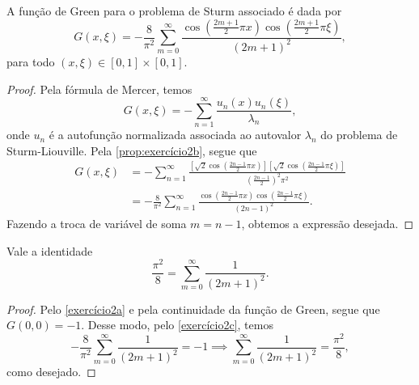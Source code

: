 \begin{corollary}\label{exercício2c}
    A função de Green para o problema de Sturm associado é dada por
    \begin{equation*}
        G(x, \xi) = - \frac{8}{\pi^2}\sum_{m = 0}^{\infty} \frac{\cos\left(\frac{2m + 1}{2}\pi x\right)\cos\left(\frac{2m + 1}{2}\pi \xi\right)}{(2m + 1)^2},
    \end{equation*}
    para todo \((x, \xi) \in [0,1]\times[0,1]\).
\end{corollary}
\begin{proof}
    Pela fórmula de Mercer, temos
    \begin{equation*}
        G(x,\xi) = - \sum_{n = 1}^{\infty} \frac{u_n(x) u_n(\xi)}{\lambda_n},
    \end{equation*}
    onde \(u_n\) é a autofunção normalizada associada ao autovalor \(\lambda_n\) do problema de Sturm-Liouville. Pela \cref{prop:exercício2b}, segue que
    \begin{align*}
        G(x, \xi) &= - \sum_{n = 1}^\infty \frac{\left[\sqrt{2}\cos\left(\frac{2n-1}{2}\pi x\right)\right]\left[\sqrt{2}\cos\left(\frac{2n-1}{2}\pi \xi\right)\right]}{\left(\frac{2n-1}{2}\right)^2\pi^2}\\
                  &= - \frac{8}{\pi^2} \sum_{n = 1}^\infty \frac{\cos\left(\frac{2n-1}{2}\pi x\right)\cos\left(\frac{2n-1}{2}\pi \xi\right)}{(2n-1)^2}.
    \end{align*}
    Fazendo a troca de variável de soma \(m = n - 1\), obtemos a expressão desejada.
\end{proof}
\begin{corollary}
    Vale a identidade
    \begin{equation*}
        \frac{\pi^2}{8} = \sum_{m = 0}^\infty \frac{1}{(2m+1)^2}.
    \end{equation*}
\end{corollary}
\begin{proof}
    Pelo \cref{exercício2a} e pela continuidade da função de Green, segue que \(G(0,0) = -1\). Desse modo, pelo \cref{exercício2c}, temos
    \begin{equation*}
        -\frac{8}{\pi^2} \sum_{m=0}^\infty \frac{1}{(2m+1)^2} = -1\implies
        \sum_{m=0}^\infty \frac{1}{(2m+1)^2} = \frac{\pi^2}{8},
    \end{equation*}
    como desejado.
\end{proof}

